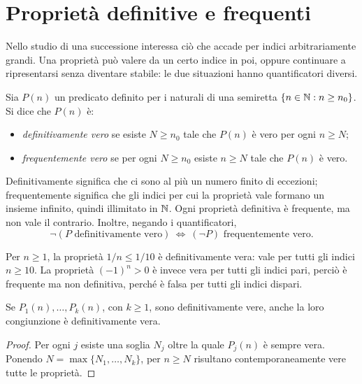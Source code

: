 \section{Proprietà definitive e frequenti}

Nello studio di una successione interessa ciò che accade per indici arbitrariamente grandi. Una proprietà può valere da un certo indice in poi, oppure continuare a ripresentarsi senza diventare stabile: le due situazioni hanno quantificatori diversi.

\begin{definizione}
Sia $P(n)$ un predicato definito per i naturali di una semiretta $\{n\in\mathbb{N}:n\ge n_0\}$. Si dice che $P(n)$ è:
\begin{itemize}
  \item \emph{definitivamente vero} se esiste $N\ge n_0$ tale che $P(n)$ è vero per ogni $n\ge N$;
  \item \emph{frequentemente vero} se per ogni $N\ge n_0$ esiste $n\ge N$ tale che $P(n)$ è vero.
\end{itemize}
\end{definizione}

Definitivamente significa che ci sono al più un numero finito di eccezioni; frequentemente significa che gli indici per cui la proprietà vale formano un insieme infinito, quindi illimitato in $\mathbb{N}$. Ogni proprietà definitiva è frequente, ma non vale il contrario. Inoltre, negando i quantificatori,
\[
\neg(P\text{ definitivamente vero})
\ \Longleftrightarrow\ (\neg P)\text{ frequentemente vero}.
\]

\begin{esempio}
Per $n\ge1$, la proprietà $1/n\le1/10$ è definitivamente vera: vale per tutti gli indici $n\ge10$. La proprietà $(-1)^n>0$ è invece vera per tutti gli indici pari, perciò è frequente ma non definitiva, perché è falsa per tutti gli indici dispari.
\end{esempio}

\begin{proposizione}
\label{prop:congiunzione-definitiva}
Se $P_1(n),\ldots,P_k(n)$, con $k\ge1$, sono definitivamente vere, anche la loro congiunzione è definitivamente vera.
\end{proposizione}
\begin{proof}
Per ogni $j$ esiste una soglia $N_j$ oltre la quale $P_j(n)$ è sempre vera. Ponendo $N=\max\{N_1,\ldots,N_k\}$, per $n\ge N$ risultano contemporaneamente vere tutte le proprietà.
\end{proof}

